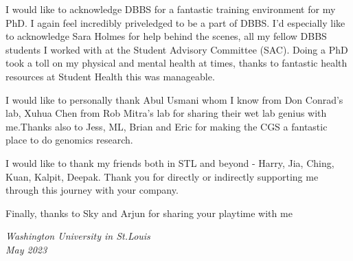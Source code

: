 I would like to acknowledge DBBS for a fantastic training environment for my PhD. I again feel incredibly priveledged to be a part of DBBS. I'd especially like to acknowledge Sara Holmes for help behind the scenes, all my fellow DBBS students I worked with at the Student Advisory Committee (SAC). Doing a PhD took a toll on my physical and mental health at times, thanks to fantastic health resources at Student Health this was manageable. 

I would like to personally thank Abul Usmani whom I know from Don Conrad's lab, Xuhua Chen from Rob Mitra's lab for sharing their wet lab genius with me.Thanks also to Jess, ML, Brian and Eric for making the CGS a fantastic place to do genomics research.

I would like to thank my friends both in STL and beyond - Harry, Jia, Ching, Kuan, Kalpit, Deepak. Thank you for directly or indirectly supporting me through this journey with your company.

Finally, thanks to Sky and Arjun for sharing your playtime with me 

\null\hfill \thesisauthor

\noindent
\textit{Washington University in St.\@ Louis}\\
\textit{May 2023}
